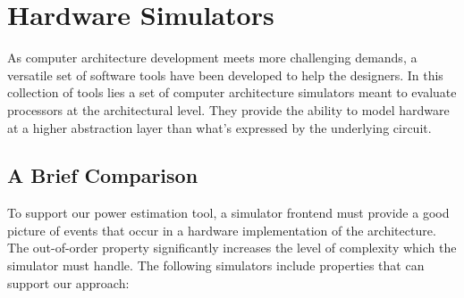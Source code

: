 \section{Hardware Simulators}

As computer architecture development meets more challenging demands, a versatile
set of software tools have been developed to help the designers. In this
collection of tools lies a set of computer architecture simulators meant to
evaluate processors at the architectural level. They provide the ability to
model hardware at a higher abstraction layer than what's expressed by the
underlying circuit.

\subsection{A Brief Comparison}
\label{subsec:simulators}
To support our power estimation tool, a simulator frontend must provide a good
picture of events that occur in a hardware implementation of the architecture.
The out-of-order property significantly increases the level of complexity which
the simulator must handle. The following simulators include properties that can
support our approach:

